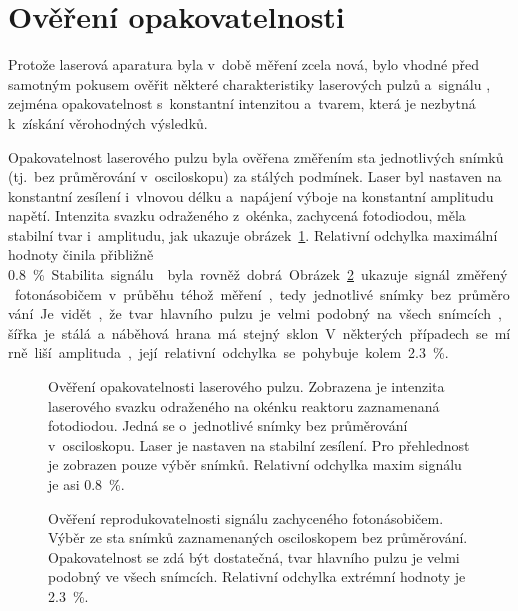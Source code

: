 \section{Ověření opakovatelnosti}
\label{sec:efish-check}
Protože laserová aparatura byla v~době měření zcela nová,
bylo vhodné před samotným pokusem ověřit některé charakteristiky
laserových pulzů a~signálu \EFISH{},
zejména opakovatelnost s~konstantní intenzitou a~tvarem,
která je nezbytná k~získání věrohodných výsledků.

Opakovatelnost laserového pulzu byla ověřena změřením sta jednotlivých
snímků (tj.~bez průměrování v~osciloskopu) za stálých podmínek.
Laser byl nastaven na konstantní zesílení i~vlnovou délku
a~napájení výboje na konstantní amplitudu napětí.
Intenzita svazku odraženého z~okénka, zachycená fotodiodou,
měla stabilní tvar i~amplitudu, jak ukazuje
obrázek~\ref{fig:efish-pulse-compare}.
Relativní odchylka maximální hodnoty činila přibližně \SI{0.8}\percent.

Stabilita signálu \EFISH{} byla rovněž dobrá.
Obrázek~\ref{fig:efish-singleshots-compare} ukazuje signál
změřený fotonásobičem v~průběhu téhož měření,
tedy jednotlivé snímky bez průměrování.
Je vidět, že tvar hlavního pulzu je velmi podobný na všech snímcích,
šířka je stálá a~náběhová hrana má stejný sklon.
V~některých případech se mírně liší amplituda,
její relativní odchylka se pohybuje kolem \SI{2.3}\percent.

\begin{figure}[htp]
	\centering
	
	\caption{Ověření opakovatelnosti laserového pulzu.
		Zobrazena je intenzita laserového svazku odraženého
		na okénku reaktoru zaznamenaná fotodiodou.
		Jedná se o~jednotlivé snímky bez průměrování v~osciloskopu.
		Laser je nastaven na stabilní zesílení.
		Pro přehlednost je zobrazen pouze výběr snímků.
		Relativní odchylka maxim signálu je asi \SI{0.8}\percent.}
	\label{fig:efish-pulse-compare}
\end{figure}

\begin{figure}[p]
	\centering
	
	\caption{Ověření reprodukovatelnosti signálu \EFISH{} zachyceného
		fotonásobičem.
		Výběr ze sta snímků zaznamenaných osciloskopem bez průměrování.
		Opakovatelnost se zdá být dostatečná,
		tvar hlavního pulzu je velmi podobný ve všech snímcích.
		Relativní odchylka extrémní hodnoty je \SI{2.3}\percent.}
	\label{fig:efish-singleshots-compare}
\end{figure}

